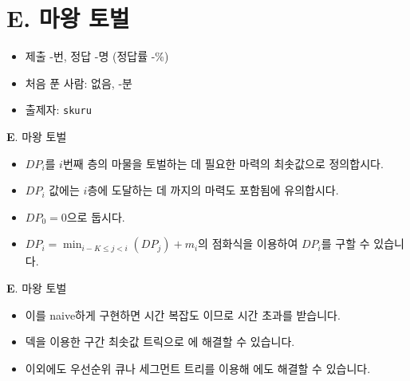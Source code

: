\section{E. 마왕 토벌}

\begin{frame} %
    \begin{itemize}
        \item 제출 -번, 정답 -명 (정답률 -\%)
        \item 처음 푼 사람: 없음, -분
        \item 출제자: \texttt{skuru}
    \end{itemize}
\end{frame}

\begin{frame}{\textbf{E}. 마왕 토벌}
    \begin{itemize}
        \item $DP_i$를 $i$번째 층의 마물을 토벌하는 데 필요한 마력의 최솟값으로 정의합시다.
        \item $DP_i$ 값에는 $i$층에 도달하는 데 까지의 마력도 포함됨에 유의합시다.
        \item $DP_0 = 0$으로 둡시다.
        \item $DP_i = \min_{i - K \le j < i}(DP_j) + m_i$의 점화식을 이용하여 $DP_i$를 구할 수 있습니다.
    \end{itemize}
\end{frame}

\begin{frame}{\textbf{E}. 마왕 토벌}
    \begin{itemize}
        \item 이를 naive하게 구현하면 시간 복잡도 이므로 시간 초과를 받습니다.
        \item 덱을 이용한 구간 최솟값 트릭으로 에 해결할 수 있습니다.
        \item 이외에도 우선순위 큐나 세그먼트 트리를 이용해 에도 해결할 수 있습니다.
    \end{itemize}
\end{frame}